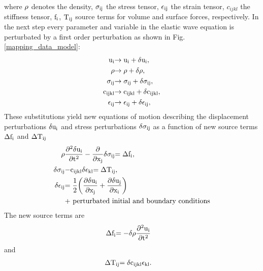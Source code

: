 where $\rm{\rho}$ denotes the density, $\rm{\sigma_{ij}}$ the stress tensor, $\rm{\epsilon_{ij}}$ the strain tensor, $c_{ijkl}$ the stiffness tensor, $\rm{f_i}$, $\rm{T_{ij}}$ source terms for volume and surface forces, respectively. 
In the next step every parameter and variable in the elastic wave equation is perturbated by a first order perturbation as shown in Fig. \ref{mapping_data_model}:
\begin{equation}
\begin{split}
\rm{u_i} & \rm{\rightarrow u_i + \delta u_i,}\\
\rm{\rho} & \rm{\rightarrow \rho + \delta \rho,}\\
\rm{\sigma_{ij}} & \rm{\rightarrow \sigma_{ij} + \delta \sigma_{ij},}\\
\rm{c_{ijkl}} & \rm{\rightarrow c_{ijkl} + \delta c_{ijkl},}\\
\rm{\epsilon_{ij}} & \rm{\rightarrow \epsilon_{ij} + \delta \epsilon_{ij},}\\
\end{split}
\label{2:10}
\end{equation}
These substitutions yield new equations of motion describing the displacement perturbations $\rm{\delta u_i}$ and stress perturbations $\rm{\delta \sigma_{ij}}$ as a function of new source 
terms $\rm{\Delta f_i}$ and $\rm{\Delta T_{ij}}$      
\begin{equation}
\begin{split}
\rm{\rho} & \rm{ \frac{\partial^2 \delta u_i}{\partial t^2} - \frac{\partial}{\partial x_j} \delta \sigma_{ij}} \rm{= \Delta f_i,} \\
\rm{\delta \sigma_{ij}} & \rm{- c_{ijkl} \delta \epsilon_{kl}} \rm{= \Delta T_{ij},}\\
\rm{\delta \epsilon_{ij}} &\rm{= \frac{1}{2} \biggl(\frac{\partial \delta u_i}{\partial x_j}+\frac{\partial \delta u_j}{\partial
x_i}\biggr)}\\
& \rm{\text{+ perturbated initial and boundary conditions}} \\
\end{split}
\label{2:11}
\end{equation}
The new source terms are 
\begin{equation}
\begin{split}
\rm{\Delta f_i} & \rm{= - \delta \rho \frac{\partial^2 u_i}{\partial t^2}}
\end{split}
\label{2:12}
\end{equation}
and
\begin{equation}
\begin{split}
\rm{\Delta T_{ij}} & \rm{= \delta c_{ijkl} \epsilon_{kl}.}
\end{split}
\label{2:13}
\end{equation}
